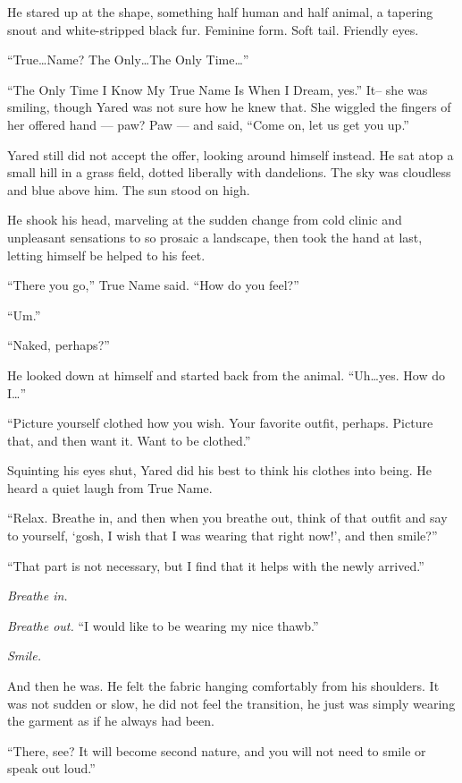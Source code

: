 He stared up at the shape, something half human and half animal, a tapering snout and white-stripped black fur. Feminine form. Soft tail. Friendly eyes.

``True\ldots Name? The Only\ldots The Only Time\ldots{}''

``The Only Time I Know My True Name Is When I Dream, yes.'' It-- she was smiling, though Yared was not sure how he knew that. She wiggled the fingers of her offered hand — paw? Paw — and said, ``Come on, let us get you up.''

Yared still did not accept the offer, looking around himself instead. He sat atop a small hill in a grass field, dotted liberally with dandelions. The sky was cloudless and blue above him. The sun stood on high.

He shook his head, marveling at the sudden change from cold clinic and unpleasant sensations to so prosaic a landscape, then took the hand at last, letting himself be helped to his feet.

``There you go,'' True Name said. ``How do you feel?''

``Um.''

``Naked, perhaps?''

He looked down at himself and started back from the animal. ``Uh\ldots yes. How do I\ldots{}''

``Picture yourself clothed how you wish. Your favorite outfit, perhaps. Picture that, and then want it. Want to be clothed.''

Squinting his eyes shut, Yared did his best to think his clothes into being. He heard a quiet laugh from True Name.

``Relax. Breathe in, and then when you breathe out, think of that outfit and say to yourself, `gosh, I wish that I was wearing that right now!', and then smile?''

``That part is not necessary, but I find that it helps with the newly arrived.''

\emph{Breathe in.}

\emph{Breathe out.} ``I would like to be wearing my nice thawb.''

\emph{Smile.}

And then he was. He felt the fabric hanging comfortably from his shoulders. It was not sudden or slow, he did not feel the transition, he just was simply wearing the garment as if he always had been.

``There, see? It will become second nature, and you will not need to smile or speak out loud.''

